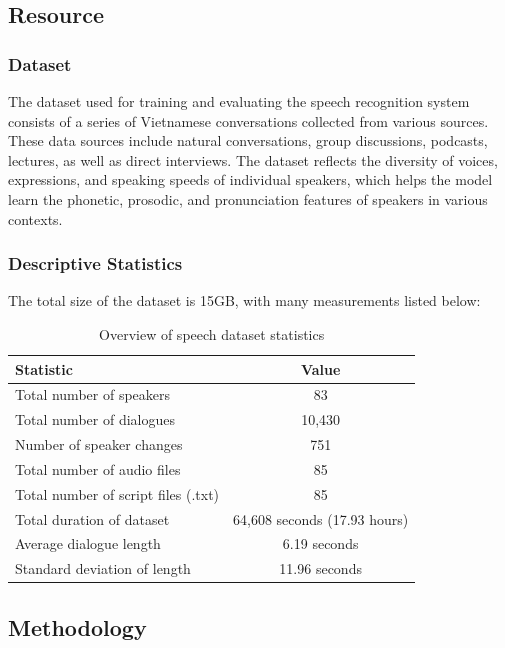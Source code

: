 \documentclass[conference]{IEEEtran}
\begin{document}
\subsection{Resource}
\subsubsection{Dataset}
The dataset used for training and evaluating the speech recognition system consists of a series of Vietnamese conversations collected from various sources. These data sources include natural conversations, group discussions, podcasts, lectures, as well as direct interviews. The dataset reflects the diversity of voices, expressions, and speaking speeds of individual speakers, which helps the model learn the phonetic, prosodic, and pronunciation features of speakers in various contexts.

\subsubsection{Descriptive Statistics}
The total size of the dataset is 15GB, with many measurements listed below:
\begin{table}[h]
    \centering
    \caption{Overview of speech dataset statistics}
    \begin{tabular}{|l|c|}
        \hline
        \textbf{Statistic}                  & \textbf{Value}               \\
        \hline
        Total number of speakers            & 83                           \\
        Total number of dialogues           & 10,430                       \\
        Number of speaker changes           & 751                          \\
        Total number of audio files         & 85                           \\
        Total number of script files (.txt) & 85                           \\
        Total duration of dataset           & 64,608 seconds (17.93 hours) \\
        Average dialogue length             & 6.19 seconds                 \\
        Standard deviation of length        & 11.96 seconds                \\
        \hline
    \end{tabular}
\end{table}
\subsection{Methodology}
\end{document}
